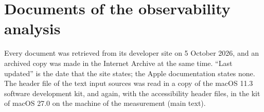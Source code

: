 
\section*{Documents of the observability analysis}
\label{sec:supp-documents}

Every document was retrieved from its developer site on 5 October 2026, and an archived copy was made in the
Internet Archive at the same time. ``Last updated'' is the date that the site states; the Apple documentation states
none. The header file of the text input sources was read in a copy of the macOS 11.3 software development kit, and
again, with the accessibility header files, in the kit of macOS 27.0 on the machine of the measurement (main text).

